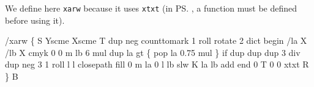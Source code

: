 \documentclass[11pt]{article}
\def\nwendcode{\endtrivlist \endgroup} %
\let\nwdocspar=\par                    %
\begin{document}
We define here {\tt{}\protect{}xarw} because it uses {\tt{}\protect{}xtxt} (in {\ps}, a function must be defined before using it).

\nwenddocs{}\endmoddef
/xarw \{ %
  S               %
    Yscme         %
    Xscme         %
    T             %
    dup neg       %
    counttomark   %
        1 roll    %
    rotate        %
    2 dict begin  %
      /la X       %
      /lb X       %
      cmyk        %
      0 0 m       %
      lb 6 mul    %
      dup         %
      la gt \{       %
        pop         %
        la 0.75 mul %
      \} if          %
      dup         %
      dup         %
      dup         %
      3 div       %
      dup         %
      neg         %
      3 1 roll    %
      l l         %
      closepath   %
      fill        %
      0 m         %
      la 0 l      %
      lb slw      %
      K           %
      la          %
      lb          %
      add         %
    end           %
    0 T           %
    0 0           %
    xtxt          %
  R               %
\} B               %
\eatline
{}\nwendcode{}\nwdocspar
\end{document}
